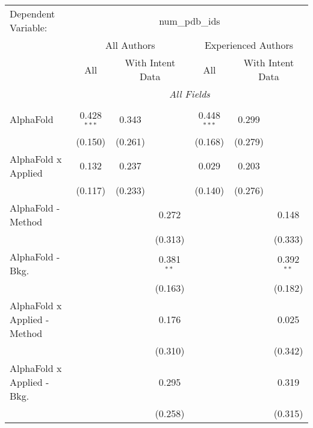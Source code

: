 \begingroup
\centering
\begin{tabular}{lcccccc}
   \tabularnewline \midrule \midrule
   Dependent Variable: & \multicolumn{6}{c}{num\_pdb\_ids}\\
 & \multicolumn{3}{c}{All Authors} & \multicolumn{3}{c}{Experienced Authors} \\
\cmidrule(lr){2-4} \cmidrule(lr){5-7}
 & \multicolumn{1}{c}{All} & \multicolumn{2}{c}{With Intent Data} & \multicolumn{1}{c}{All} & \multicolumn{2}{c}{With Intent Data} \\
\cmidrule(lr){2-2} \cmidrule(lr){3-4} \cmidrule(lr){5-5} \cmidrule(lr){6-7}
 & \multicolumn{6}{c}{\textit{All Fields}} \\ \\
   AlphaFold                      & 0.428$^{***}$ & 0.343        &              & 0.448$^{***}$  & 0.299        &   \\   
                                  & (0.150)       & (0.261)      &              & (0.168)        & (0.279)      &   \\   
   AlphaFold x Applied            & 0.132         & 0.237        &              & 0.029          & 0.203        &   \\   
                                  & (0.117)       & (0.233)      &              & (0.140)        & (0.276)      &   \\   
   AlphaFold - Method             &               &              & 0.272        &                &              & 0.148\\   
                                  &               &              & (0.313)      &                &              & (0.333)\\   
   AlphaFold - Bkg.               &               &              & 0.381$^{**}$ &                &              & 0.392$^{**}$\\   
                                  &               &              & (0.163)      &                &              & (0.182)\\   
   AlphaFold x Applied - Method   &               &              & 0.176        &                &              & 0.025\\   
                                  &               &              & (0.310)      &                &              & (0.342)\\   
   AlphaFold x Applied - Bkg.     &               &              & 0.295        &                &              & 0.319\\   
                                  &               &              & (0.258)      &                &              & (0.315)\\   

\end{tabular}
